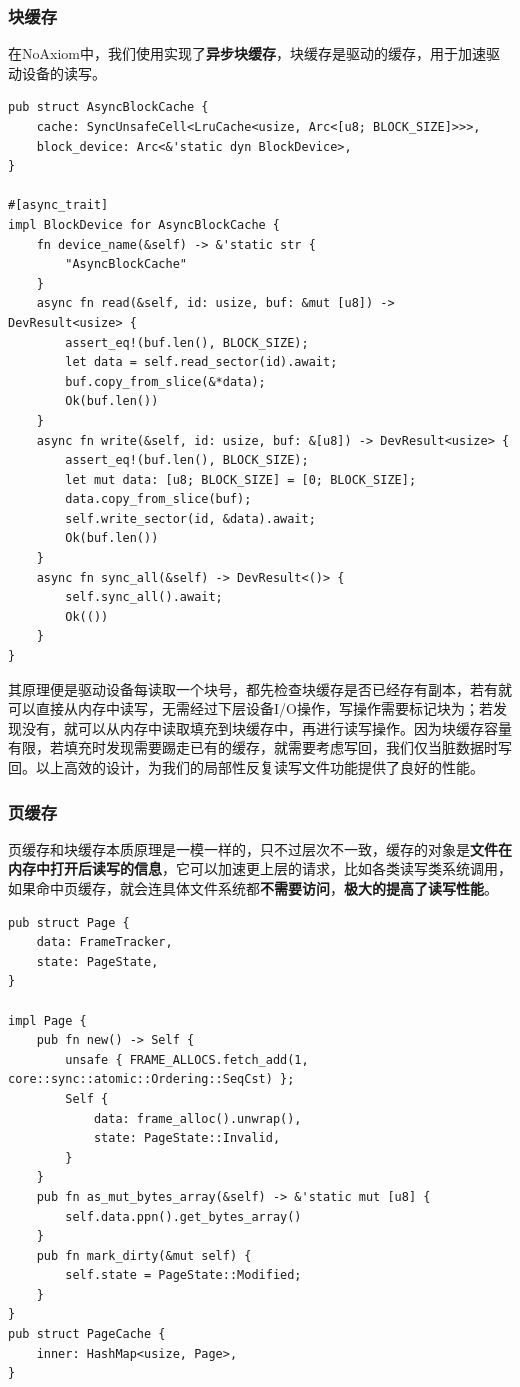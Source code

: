 \documentclass{article}
\begin{document}
\subsubsection{块缓存}
在NoAxiom中，我们使用实现了\textbf{异步块缓存}，块缓存是驱动的缓存，用于加速驱动设备的读写。
\begin{lstlisting}
pub struct AsyncBlockCache {
    cache: SyncUnsafeCell<LruCache<usize, Arc<[u8; BLOCK_SIZE]>>>,
    block_device: Arc<&'static dyn BlockDevice>,
}

#[async_trait]
impl BlockDevice for AsyncBlockCache {
    fn device_name(&self) -> &'static str {
        "AsyncBlockCache"
    }
    async fn read(&self, id: usize, buf: &mut [u8]) -> DevResult<usize> {
        assert_eq!(buf.len(), BLOCK_SIZE);
        let data = self.read_sector(id).await;
        buf.copy_from_slice(&*data);
        Ok(buf.len())
    }
    async fn write(&self, id: usize, buf: &[u8]) -> DevResult<usize> {
        assert_eq!(buf.len(), BLOCK_SIZE);
        let mut data: [u8; BLOCK_SIZE] = [0; BLOCK_SIZE];
        data.copy_from_slice(buf);
        self.write_sector(id, &data).await;
        Ok(buf.len())
    }
    async fn sync_all(&self) -> DevResult<()> {
        self.sync_all().await;
        Ok(())
    }
}
\end{lstlisting}

其原理便是驱动设备每读取一个块号，都先检查块缓存是否已经存有副本，若有就可以直接从内存中读写，无需经过下层设备I/O操作，写操作需要标记块为；若发现没有，就可以从内存中读取填充到块缓存中，再进行读写操作。因为块缓存容量有限，若填充时发现需要踢走已有的缓存，就需要考虑写回，我们仅当脏数据时写回。以上高效的设计，为我们的局部性反复读写文件功能提供了良好的性能。

\subsubsection{页缓存}

页缓存和块缓存本质原理是一模一样的，只不过层次不一致，缓存的对象是\textbf{文件在内存中打开后读写的信息}，它可以加速更上层的请求，比如各类读写类系统调用，如果命中页缓存，就会连具体文件系统都\textbf{不需要访问}，\textbf{极大的提高了读写性能}。

\begin{lstlisting}
pub struct Page {
    data: FrameTracker,
    state: PageState,
}

impl Page {
    pub fn new() -> Self {
        unsafe { FRAME_ALLOCS.fetch_add(1, core::sync::atomic::Ordering::SeqCst) };
        Self {
            data: frame_alloc().unwrap(),
            state: PageState::Invalid,
        }
    }
    pub fn as_mut_bytes_array(&self) -> &'static mut [u8] {
        self.data.ppn().get_bytes_array()
    }
    pub fn mark_dirty(&mut self) {
        self.state = PageState::Modified;
    }
}
pub struct PageCache {
    inner: HashMap<usize, Page>,
}
\end{lstlisting}
\end{document}
